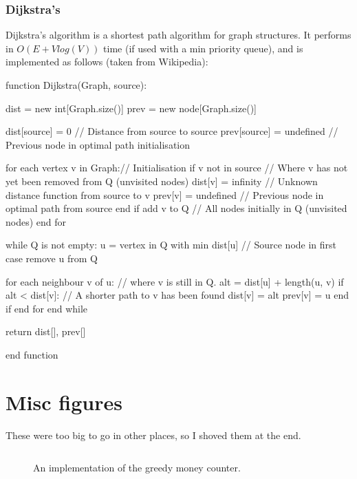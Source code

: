 \subsubsection{Dijkstra's}

Dijkstra's algorithm is a shortest path algorithm for graph structures. It
performs in $O(E + Vlog(V))$ time (if used with a min priority queue), and is
implemented as follows (taken from Wikipedia):

\begin{ccode}
  function Dijkstra(Graph, source):

    dist = new int[Graph.size()]
    prev = new node[Graph.size()]

    dist[source] = 0           // Distance from source to source
    prev[source] = undefined   // Previous node in optimal path initialisation

    for each vertex v in Graph:// Initialisation
      if v not in source       // Where v has not yet been removed from Q (unvisited nodes)
        dist[v] = infinity     // Unknown distance function from source to v
        prev[v] = undefined    // Previous node in optimal path from source
      end if 
      add v to Q               // All nodes initially in Q (unvisited nodes)
    end for
    
    while Q is not empty:
      u = vertex in Q with min dist[u]  // Source node in first case
      remove u from Q 
      
      for each neighbour v of u:        // where v is still in Q.
        alt = dist[u] + length(u, v)
        if alt < dist[v]:               // A shorter path to v has been found
          dist[v] = alt 
          prev[v] = u 
        end if
      end for
    end while

    return dist[], prev[]

  end function
\end{ccode}


\section{Misc figures}

These were too big to go in other places, so I shoved them at the end.

\begin{figure}[H]
  \label{greedy}
  \inputminted{java}{code/Greedy/Greedy.java}
  \caption{An implementation of the greedy money counter.}
\end{figure}